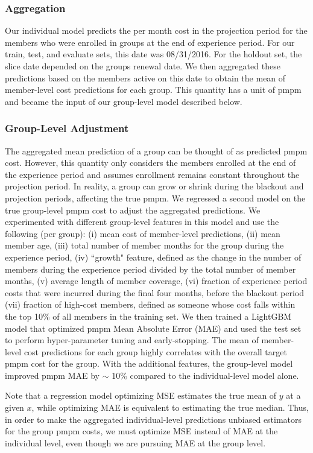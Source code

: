 \documentclass[letterpaper]{article}
\begin{document}
\subsubsection{Aggregation}
Our individual model predicts the per month cost in the projection period for the members who were enrolled in groups at the end of experience period. For our train, test, and evaluate sets, this date was 08/31/2016. For the holdout set, the slice date depended on the groups renewal date. We then aggregated these predictions based on the members active on this date to obtain the mean of member-level cost predictions for each group. This quantity has a unit of pmpm and became the input of our group-level model described below.

\subsubsection{Group-Level Adjustment}
The aggregated mean prediction of a group can be thought of as predicted pmpm cost. However, this quantity only considers the
members enrolled at the end of the experience period and assumes enrollment remains constant throughout the projection period. In reality, a group can grow or shrink during the blackout and projection periods, affecting the true pmpm. We regressed a second model on the true group-level pmpm cost to
adjust the aggregated predictions. We experimented with different group-level features in this model and use the following (per group):
(i) mean cost of member-level predictions, (ii) mean member age,
(iii) total number of member months for the group during the experience period, (iv) ``growth" feature, defined as the change in the number of members during the experience period divided by the total number of member months, (v) average length of member coverage,
(vi) fraction of experience period costs that were incurred during the final four months, before the blackout period (vii) fraction of high-cost members, defined as someone whose cost falls within the top 10\% of all members in the training set.
We then trained a LightGBM model that optimized pmpm Mean Absolute Error (MAE) and used the test set to perform hyper-parameter tuning and early-stopping. The mean of member-level cost predictions for each group highly correlates with the overall target pmpm cost for the group. With the additional features, the group-level model improved pmpm MAE by $\sim$ 10\% compared to the individual-level model alone.

Note that a regression model optimizing MSE estimates the true mean of $y$ at a given $x$, while optimizing MAE is equivalent to estimating the true median. Thus, in order to make the aggregated individual-level predictions unbiased estimators for the group pmpm costs, we must optimize MSE instead of MAE at the individual level, even though we are pursuing MAE at the group level.
\end{document}
